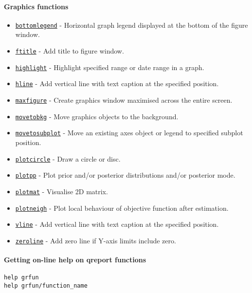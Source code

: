 

	\paragraph{Graphics functions}

\begin{itemize}
\itemsep1pt\parskip0pt
\item
  \href{grfun/bottomlegend}{\texttt{bottomlegend}} - Horizontal graph
  legend displayed at the bottom of the figure window.
\item
  \href{grfun/ftitle}{\texttt{ftitle}} - Add title to figure window.
\item
  \href{grfun/highlight}{\texttt{highlight}} - Highlight specified range
  or date range in a graph.
\item
  \href{grfun/hline}{\texttt{hline}} - Add vertical line with text
  caption at the specified position.
\item
  \href{grfun/maxfigure}{\texttt{maxfigure}} - Create graphics window
  maximised across the entire screen.
\item
  \href{grfun/movetobkg}{\texttt{movetobkg}} - Move graphics objects to
  the background.
\item
  \href{grfun/movetosubplot}{\texttt{movetosubplot}} - Move an existing
  axes object or legend to specified subplot position.
\item
  \href{grfun/plotcircle}{\texttt{plotcircle}} - Draw a circle or disc.
\item
  \href{grfun/plotpp}{\texttt{plotpp}} - Plot prior and/or posterior
  distributions and/or posterior mode.
\item
  \href{grfun/plotmat}{\texttt{plotmat}} - Visualise 2D matrix.
\item
  \href{grfun/plotneigh}{\texttt{plotneigh}} - Plot local behaviour of
  objective function after estimation.
\item
  \href{grfun/vline}{\texttt{vline}} - Add vertical line with text
  caption at the specified position.
\item
  \href{grfun/zeroline}{\texttt{zeroline}} - Add zero line if Y-axis
  limits include zero.
\end{itemize}

\paragraph{Getting on-line help on qreport
functions}

\begin{verbatim}
help grfun
help grfun/function_name
\end{verbatim}



